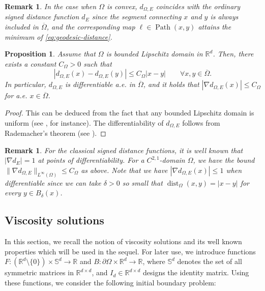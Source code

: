 \documentclass[11pt]{article}
\numberwithin{equation}{section}
\newtheorem{proposition}[theorem]{Proposition}
\newtheorem{remark}[theorem]{Remark}
\newcommand{\R}{\mathbb{R}}
\newcommand{\closure}[1]{\overline{#1}}
\def\leq{\leqslant}
\begin{document}
\begin{remark}
    In the case when $\Omega$ is convex, $d_{\Omega,E}$ coincides with the ordinary signed distance function $d_E$
    since the segment connecting $x$ and $y$ is always included in $\closure{\Omega}$,
    and the corresponding map $\ell\in\operatorname{Path}(x,y)$ attains the minimum of \eqref{eq:geodesic-distance}.
\end{remark}

\begin{proposition}
    \label{prop:geodesic-uniform-bounded}
    Assume that $\Omega$ is bounded Lipschitz domain in $\R^d$. Then, there exists a constant $C_\Omega > 0$ such that
    \[
    |d_{\Omega,E}(x) - d_{\Omega,E}(y)| \leq C_\Omega|x-y|\qquad\forall x,y\in\closure{\Omega}.
    \]
    In particular, $d_{\Omega,E}$ is differentiable a.e. in $\closure{\Omega}$, and it holds that $|\nabla d_{\Omega,E}(x)|\leq C_\Omega$ for a.e. $x\in\closure{\Omega}$.
\end{proposition}
\begin{proof}
    This can be deduced from the fact that any bounded Lipschitz domain is uniform (see \cite{BH07}, for instance).
    The differentiability of $d_{\Omega,E}$ follows from Rademacher's theorem (see \cite[Theorem 3.2]{EG15}).
\end{proof}

\begin{remark}
    For the classical signed distance functions, it is well known that $|\nabla d_E| = 1$ at points of differentiability.
    For a $C^{2,1}$-domain $\Omega$, we have the bound $\|\nabla d_{\Omega,E}\|_{L^\infty(\Omega)}\leq C_\Omega$ as above.
    Note that we have $|\nabla d_{\Omega,E}(x)|\leq 1$ when differentiable since we can take $\delta > 0$ so small that
    $\operatorname{dist}_{\Omega}(x,y) = |x-y|$ for every $y\in B_\delta(x)$.
\end{remark}

\subsection{Viscosity solutions}\label{sec:viscosity-sol}
In this section, we recall the notion of viscosity solutions and its well known properties which will be used in the sequel.
For later use, we introduce functions $F:(\R^d\setminus\{0\})\times \mathbb S^{d}\to \R$ and $B:\partial\Omega\times \R^d\to\R$,
where $\mathbb S^{d}$ denotes the set of all symmetric matrices in $\R^{d\times d}$, and $I_d\in \R^{d\times d}$ designs the identity matrix.
Using these functions, we consider the following initial boundary problem:
\end{document}
